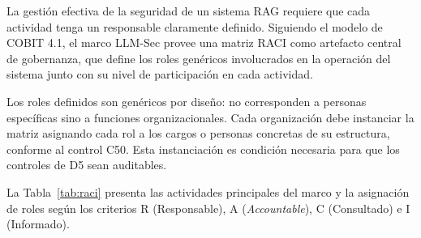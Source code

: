 La gestión efectiva de la seguridad de un sistema RAG requiere que cada actividad tenga un responsable claramente definido. Siguiendo el modelo de COBIT 4.1, el marco LLM-Sec provee una matriz RACI como artefacto central de gobernanza, que define los roles genéricos involucrados en la operación del sistema junto con su nivel de participación en cada actividad.

Los roles definidos son genéricos por diseño: no corresponden a personas específicas sino a funciones organizacionales. Cada organización debe instanciar la matriz asignando cada rol a los cargos o personas concretas de su estructura, conforme al control C50. Esta instanciación es condición necesaria para que los controles de D5 sean auditables.

La Tabla~\ref{tab:raci} presenta las actividades principales del marco y la asignación de roles según los criterios R (Responsable), A (\textit{Accountable}), C (Consultado) e I (Informado).

